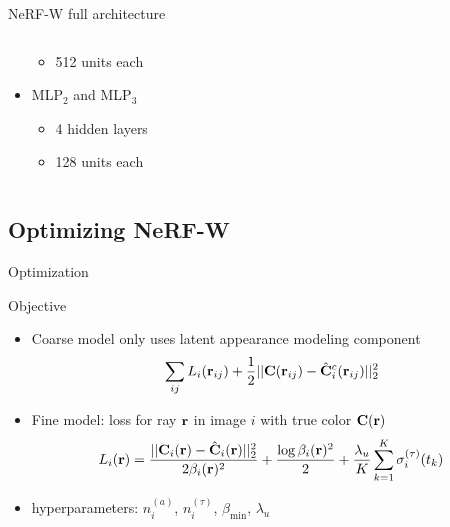 \documentclass[aspectratio=1610]{beamer}
\begin{document}
\begin{frame}{NeRF-W full architecture}
\begin{onlyenv}
\begin{columns}
\begin{column}{.3\textwidth}
\begin{itemize}
\begin{itemize}
                        \item 512 units each
                    \end{itemize}
                    \item MLP\(_2\) and MLP\(_3\)
                    \begin{itemize}
                        \item 4 hidden layers
                        \item 128 units each
                    \end{itemize}
                \end{itemize}
            \end{column}
        \end{columns}

    \end{onlyenv}
\end{frame}

\subsection{Optimizing NeRF-W}
\begin{frame}{Optimization}
    \begin{block}{Objective}
        \begin{itemize}
            \item Coarse model only uses latent appearance modeling component
            \begin{equation*}
                \sum_{ij} L_i (\vb{r}_{ij}) + \frac{1}{2} || \vb{C} (\vb{r}_{ij}) - \hat{\vb{C}}_i^c (\vb{r}_{ij}) ||^2_2 
            \end{equation*}
            \item Fine model: loss for ray \(\vb{r}\) in image \(i\) with true color \(\vb{C}(\vb{r})\)
            \begin{equation*}
                L_i(\vb{r}) 
                = \frac{|| \vb{C}_i (\vb{r}) - \hat{\vb{C}}_i (\vb{r}) ||_2^2}{2\beta_i (\vb{r})^2} 
                + \frac{\log \beta_i (\vb{r})^2}{2} 
                + \frac{\lambda_u}{K} \sum^K_{k=1}\sigma_i^{(\tau)} (t_k)
            \end{equation*}
            \item hyperparameters: \(n_i^{(a)}\), \(n_i^{(\tau)}\), \(\beta_{\textrm{min}}\), \(\lambda_u\)
        \end{itemize}
    \end{block}  
\end{frame}
\end{document}
